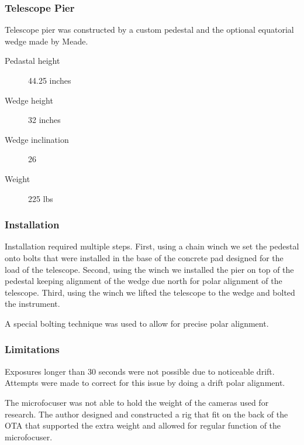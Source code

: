 \subsubsection{Telescope Pier}
Telescope pier was constructed by a custom pedestal and the optional equatorial wedge made by Meade.
\begin{description}
    \item[Pedastal height] 44.25 inches
    \item[Wedge height] 32 inches
    \item[Wedge inclination] \SI{26}{\deg}
    \item[Weight] 225 lbs
\end{description}

\subsubsection{Installation}
Installation required multiple steps.
First, using a chain winch we set the pedestal onto bolts that were installed in the base of the concrete pad designed for the load of the telescope. 
Second, using the winch we installed the pier on top of the pedestal keeping alignment of the wedge due north for polar alignment of the telescope.
Third, using the winch we lifted the telescope to the wedge and bolted the instrument.

A special bolting technique was used to allow for precise polar alignment.

\subsubsection{Limitations}
Exposures longer than 30 seconds were not possible due to noticeable drift.
Attempts were made to correct for this issue by doing a drift polar alignment.

The microfocuser was not able to hold the weight of the cameras used for research.
The author designed and constructed a rig that fit on the back of the OTA that supported the extra weight and allowed
for regular function of the microfocuser.

% 
% 
